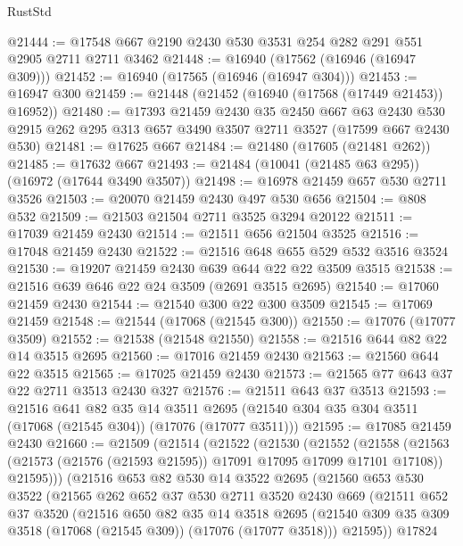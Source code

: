 \begin{lexlean}{RustStd}
\begin{coremodule}
@21444 := @17548 @667 @2190 @2430 @530 @3531 @254 @282 @291 @551 @2905 @2711 @2711 @3462
@21448 := @16940 (@17562 (@16946 (@16947 @309)))
@21452 := @16940 (@17565 (@16946 (@16947 @304)))
@21453 := @16947 @300
@21459 := @21448 (@21452 (@16940 (@17568 (@17449 @21453)) @16952))
@21480 := @17393
    @21459
    @2430
    @35
    @2450
    @667
    @63
    @2430
    @530
    @2915
    @262
    @295
    @313
    @657
    @3490
    @3507
    @2711
    @3527
    (@17599 @667 @2430 @530)
@21481 := @17625 @667
@21484 := @21480 (@17605 (@21481 @262))
@21485 := @17632 @667
@21493 := @21484 (@10041 (@21485 @63 @295)) (@16972 (@17644 @3490 @3507))
@21498 := @16978 @21459 @657 @530 @2711 @3526
@21503 := @20070 @21459 @2430 @497 @530 @656
@21504 := @808 @532
@21509 := @21503 @21504 @2711 @3525 @3294 @20122
@21511 := @17039 @21459 @2430
@21514 := @21511 @656 @21504 @3525
@21516 := @17048 @21459 @2430
@21522 := @21516 @648 @655 @529 @532 @3516 @3524
@21530 := @19207 @21459 @2430 @639 @644 @22 @22 @3509 @3515
@21538 := @21516 @639 @646 @22 @24 @3509 (@2691 @3515 @2695)
@21540 := @17060 @21459 @2430
@21544 := @21540 @300 @22 @300 @3509
@21545 := @17069 @21459
@21548 := @21544 (@17068 (@21545 @300))
@21550 := @17076 (@17077 @3509)
@21552 := @21538 (@21548 @21550)
@21558 := @21516 @644 @82 @22 @14 @3515 @2695
@21560 := @17016 @21459 @2430
@21563 := @21560 @644 @22 @3515
@21565 := @17025 @21459 @2430
@21573 := @21565 @77 @643 @37 @22 @2711 @3513 @2430 @327
@21576 := @21511 @643 @37 @3513
@21593 := @21516
    @641
    @82
    @35
    @14
    @3511
    @2695
    (@21540 @304 @35 @304 @3511 (@17068 (@21545 @304)) (@17076 (@17077 @3511)))
@21595 := @17085 @21459 @2430
@21660 := @21509
    (@21514
      (@21522
        (@21530
          (@21552
            (@21558
              (@21563 (@21573 (@21576 (@21593 @21595)) @17091 @17095 @17099 @17101 @17108))
              @21595)))
        (@21516
          @653
          @82
          @530
          @14
          @3522
          @2695
          (@21560
            @653
            @530
            @3522
            (@21565
              @262
              @652
              @37
              @530
              @2711
              @3520
              @2430
              @669
              (@21511
                @652
                @37
                @3520
                (@21516
                  @650
                  @82
                  @35
                  @14
                  @3518
                  @2695
                  (@21540 @309 @35 @309 @3518 (@17068 (@21545 @309)) (@17076 (@17077 @3518)))
                  @21595))
              @17824

\end{coremodule}
\end{lexlean}
